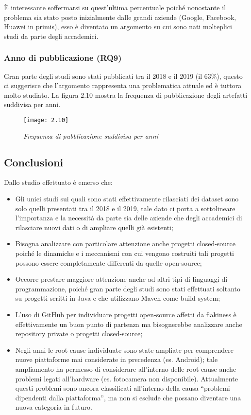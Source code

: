 È interessante soffermarsi su quest’ultima percentuale poiché nonostante il problema sia stato posto inizialmente dalle grandi aziende (Google, Facebook, Huawei in primis), esso è diventato un argomento su cui sono nati molteplici studi da parte degli accademici.
\subsubsection{Anno di pubblicazione (RQ9)}
Gran parte degli studi sono stati pubblicati tra il 2018 e il 2019 (il 63\%), questo ci suggerisce che l’argomento rappresenta una problematica attuale ed è tuttora molto studiato.
La figura 2.10 mostra la frequenza di pubblicazione degli artefatti suddivisa per anni.
\newpage
\begin{figure}[h]
	\centering
	\texttt{[image: 2.10]}
	\caption{\emph{Frequenza di pubblicazione suddivisa per anni}}
	\label{fig:mesh1}
\end{figure}
\subsection{Conclusioni}
	Dallo studio effettuato è emerso che:
\begin{itemize}

	\item  Gli unici studi sui quali sono stati effettivamente rilasciati dei dataset sono
	solo quelli presentati tra il 2018 e il 2019, tale dato ci porta a sottolineare l’importanza e la necessità da parte sia delle aziende che degli accademici
	di rilasciare nuovi dati o di ampliare quelli già esistenti;
	\item Bisogna analizzare con particolare attenzione anche progetti closed-source
	poiché le dinamiche e i meccanismi con cui vengono costruiti tali progetti possono essere completamente differenti da quelle open-source;
	\item Occorre prestare maggiore attenzione anche ad altri tipi di linguaggi di programmazione, poiché gran parte degli studi sono stati effettuati soltanto
	su progetti scritti in Java e che utilizzano Maven come build system;
	\item  L’uso di GitHub per individuare progetti open-source affetti da flakiness è effettivamente un buon punto di partenza ma bisognerebbe analizzare anche
	repository private o progetti closed-source;
	\item  Negli anni le root cause individuate sono state ampliate per comprendere nuove piattaforme mai considerate in precedenza (es. Android); tale
	ampliamento ha permesso di considerare all’interno delle root cause anche problemi legati all’hardware (es. fotocamera non disponibile). Attualmente questi problemi sono ancora classificati all’interno della causa “problemi
	dipendenti dalla piattaforma”, ma non si esclude che possano diventare una nuova categoria in futuro.
\end{itemize}
 